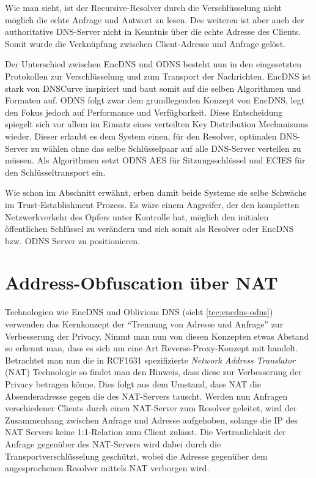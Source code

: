Wie man sieht, ist der Recursive-Resolver durch die Verschlüsselung nicht möglich die echte Anfrage und Antwort zu lesen. Des weiteren ist aber auch der authoritative DNS-Server nicht in Kenntnis über die echte Adresse des Clients. Somit wurde die Verknüpfung zwischen Client-Adresse und Anfrage gelöst.

Der Unterschied zwischen EncDNS und ODNS besteht nun in den eingesetzten Protokollen zur Verschlüsselung und zum Transport der Nachrichten. EncDNS ist stark von DNSCurve inspiriert und baut somit auf die selben Algorithmen und Formaten auf. ODNS folgt zwar dem grundlegenden Konzept von EncDNS, legt den Fokus jedoch auf Performance und Verfügbarkeit. Diese Entscheidung spiegelt sich vor allem im Einsatz eines verteilten Key Distribution Mechanismus wieder. Dieser erlaubt es dem System einen, für den Resolver, optimalen DNS-Server zu wählen ohne das selbe Schlüsselpaar auf alle DNS-Server verteilen zu müssen. Als Algorithmen setzt ODNS AES für Sitzungsschlüssel und ECIES für den Schlüsseltransport ein.

Wie schon im Abschnitt  erwähnt, erben damit beide Systeme sie selbe Schwäche im Trust-Establishment Prozess. Es wäre einem Angreifer, der den kompletten Netzwerkverkehr des Opfers unter Kontrolle hat, möglich den initialen öffentlichen Schlüssel zu verändern und sich somit als Resolver oder EncDNS bzw. ODNS Server zu positionieren.

\section{Address-Obfuscation über NAT}
\label{sec:tec-nat}
Technologien wie EncDNS und Oblivious DNS (sieht \ref{tec:encdns-odns}) verwenden das Kernkonzept der ``Trennung von Adresse und Anfrage'' zur Verbesserung der Privacy. Nimmt man nun von diesen Konzepten etwas Abstand so erkennt man, dass es sich um eine Art Reverse-Proxy-Konzept mit handelt. Betrachtet man nun die in RCF1631\cite{rfc1631} spezifizierte \textit{Network Address Translator} (NAT) Technologie so findet man den Hinweis, dass diese zur Verbesserung der Privacy betragen könne. Dies folgt aus dem Umstand, dass NAT die Absenderadresse gegen die des NAT-Servers tauscht. Werden nun Anfragen verschiedener Clients durch einen NAT-Server zum Resolver geleitet, wird der Zusammenhang zwischen Anfrage und Adresse aufgehoben, solange die IP des NAT Servers keine 1:1-Relation zum Client zulässt. Die Vertraulichkeit der Anfrage gegenüber des NAT-Servers wird dabei durch die Transportverschlüsselung geschützt, wobei die Adresse gegenüber dem angesprochenen Resolver mittels NAT verborgen wird.


